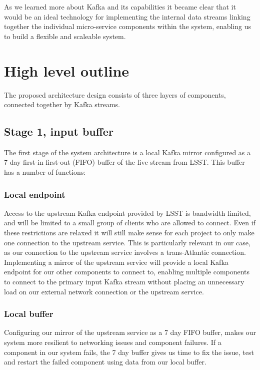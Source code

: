 \documentclass{article}
\newcommand{\scaleable} {scaleable\xspace}
\newcommand{\kafka} {Kafka\xspace}
\newcommand{\fifo} {FIFO\xspace}
\newcommand{\lsst} {LSST\xspace}
\begin{document}
As we learned more about \kafka and its capabilities it became clear that it would be an ideal technology for implementing the internal data streams linking together the individual micro-service components within the system, enabling us to build a flexible and \scaleable system.


\section{High level outline}
\label{high-level-outline}

The proposed architecture design consists of three layers of components, connected together by \kafka streams.

\subsection{Stage 1, input buffer}
\label{stage-1}

The first stage of the system architecture is a local \kafka mirror configured as a 7 day first-in first-out (\fifo) buffer of the live stream from \lsst. This buffer has a number of functions:

\subsubsection{Local endpoint}
\label{stage-1.local-endpoint}
Access to the upstream \kafka endpoint provided by \lsst is bandwidth limited, and will be limited to a small group of clients who are allowed to connect. Even if these restrictions are relaxed it will still make sense for each project to only make one connection to the upstream service.
This is particularly relevant in our case, as our connection to the upstream service involves a trans-Atlantic connection.
Implementing a mirror of the upstream service will provide a local \kafka endpoint for our other components to connect to, enabling multiple components to connect to the primary input \kafka stream without placing an unnecessary load on our external network connection or the upstream service.

\subsubsection{Local buffer}
\label{stage-1.local-buffer}
Configuring our mirror of the upstream service as a 7 day \fifo buffer, makes our system more resilient to networking issues and component failures.
If a component in our system fails, the 7 day buffer gives us time to fix the issue, test and restart the failed component using data from our local buffer.
\end{document}
